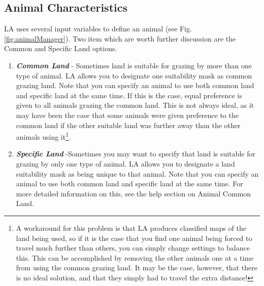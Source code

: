   \subsection{Animal Characteristics}
  LA uses several input variables  to define an animal (see Fig.
  \ref{fig:animalManager}).  Two item which are worth further discussion are
  the Common and Specific Land options.
      \begin{enumerate}
        \item \textit{\textbf{Common Land}} - Sometimes land is suitable for
        grazing by more than one type of animal. LA allows you to
        designate one suitability mask as common grazing land. Note that you
        can specify an animal to use both common land and specific land at the
        same time. If this is the case, equal preference is given to all
        animals grazing the common land. This is not always ideal, as it may
        have been the case that some animals were given preference to the
        common land if the other suitable land was further away than the other
        animals using it\footnote{A workaround for this problem is that LA
        produces classified maps of the land being used, so if it is
        the case that you find one animal being forced to travel much further
        than others, you can simply change settings to balance this. This can
        be accomplished by removing the other animals one at a time from using
        the common grazing land. It may be the case, however, that there is no
        ideal solution, and that they simply had to travel the extra
        distance!}.
        \item \textit{\textbf{Specific Land}} -Sometimes you may want to
        specify that land is suitable for grazing by only one type of animal.
        LA allows you to designate a land suitability mask as
        being unique to that animal.  Note that you can specify an animal to
        use both common land and specific land at the same time. For more
        detailed information on this, see the help section on Animal Common
        Land.   
\end{enumerate}


